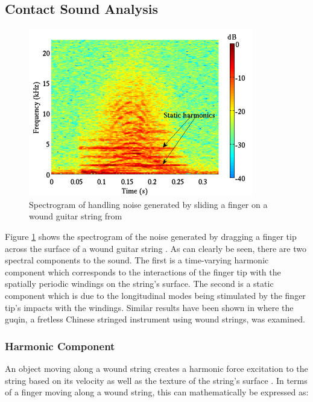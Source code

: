 \documentclass[main.tex]{subfiles}
\begin{document}
\subsection{Contact Sound Analysis}
\begin{figure}[h]
    \centering
    \includegraphics[scale=1]{./images/pictures/finger-noise-spectrogram.png}
    \caption{Spectrogram of handling noise generated by sliding a finger on a wound guitar string from }
    \label{fig:finger_noise_spectrogram}
\end{figure}

Figure \ref{fig:finger_noise_spectrogram} shows the spectrogram of the noise generated by dragging a finger tip across the surface of a wound guitar string . As can clearly be seen, there are two spectral components to the sound. The first is a time-varying harmonic component which corresponds to the interactions of the finger tip with the spatially periodic windings on the string's surface. The second is a static component which is due to the longitudinal modes being stimulated by the finger tip's impacts with the windings. Similar results have been shown in  where the guqin, a fretless Chinese stringed instrument using wound strings, was examined.

\subsubsection{Harmonic Component}
An object moving along a wound string creates a harmonic force excitation to the string based on its velocity as well as the texture of the string's surface . In terms of a finger moving along a wound string, this can mathematically be expressed as:
\end{document}
